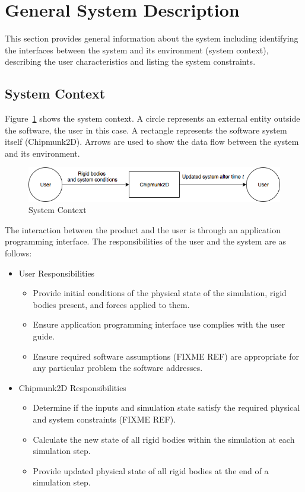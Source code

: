\documentclass[12pt]{article}
\begin{document}
\section{General System Description}
\label{Sec:GenSysDesc}
This section provides general information about the system including identifying the interfaces between the system and its environment (system context), describing the user characteristics and listing the system constraints.
\subsection{System Context}
\label{Sec:SysContext}
Figure~\ref{Figure:sysCtxDiag} shows the system context. A circle represents an external entity outside the software, the user in this case. A rectangle represents the software system itself (Chipmunk2D). Arrows are used to show the data flow between the system and its environment.
\begin{figure}
\begin{center}
\includegraphics[width=\textwidth]{../../../datafiles/GamePhysics/sysctx.png}
\caption{System Context}
\label{Figure:sysCtxDiag}
\end{center}
\end{figure}
The interaction between the product and the user is through an application programming interface. The responsibilities of the user and the system are as follows:
\begin{itemize}
\item{User Responsibilities}
\begin{itemize}
\item{Provide initial conditions of the physical state of the simulation, rigid bodies present, and forces applied to them.}
\item{Ensure application programming interface use complies with the user guide.}
\item{Ensure required software assumptions (FIXME REF) are appropriate for any particular problem the software addresses.}
\end{itemize}
\item{Chipmunk2D Responsibilities}
\begin{itemize}
\item{Determine if the inputs and simulation state satisfy the required physical and system constraints (FIXME REF).}
\item{Calculate the new state of all rigid bodies within the simulation at each simulation step.}
\item{Provide updated physical state of all rigid bodies at the end of a simulation step.}
\end{itemize}
\end{itemize}
\end{document}
